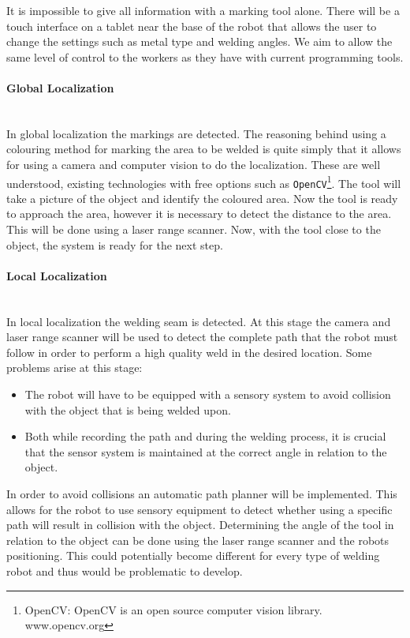 It is impossible to give all information with a marking tool alone.
There will be a touch interface on a tablet near the base of the robot that allows the user to change the settings such as metal type and welding angles. 
We aim to allow the same level of control to the workers as they have with current programming tools.
\paragraph*{Global Localization}~\\
In global localization the markings are detected.
The reasoning behind using a colouring method for marking the area to be welded is quite simply that it allows for using a camera and computer vision to do the localization. 
These are well understood, existing technologies with free options such as \texttt{OpenCV}\footnote{OpenCV: OpenCV is an open source computer vision library. www.opencv.org}. 
The tool will take a picture of the object and identify the coloured area. 
Now the tool is ready to approach the area, however it is necessary to detect the distance to the area. 
This will be done using a laser range scanner. Now, with the tool close to the object, the system is ready for the next step.
\paragraph*{Local Localization}~\\
In local localization the welding seam is detected.
At this stage the camera and laser range scanner will be used to detect the complete path that the robot must follow in order to perform a high quality weld in the desired location. 
Some problems arise at this stage:
\begin{itemize}
	\item The robot will have to be equipped with a sensory system to avoid collision with the object that is being welded upon. 
	\item Both while recording the path and during the welding process, it is crucial that the sensor system is maintained at the correct angle in relation to the object. 
\end{itemize}
In order to avoid collisions an automatic path planner will be implemented. This allows for the robot to use sensory equipment to detect whether using a specific path will result in collision with the object.
Determining the angle of the tool in relation to the object can be done using the laser range scanner and the robots positioning. This could potentially become different for every type of welding robot and thus would be problematic to develop.

